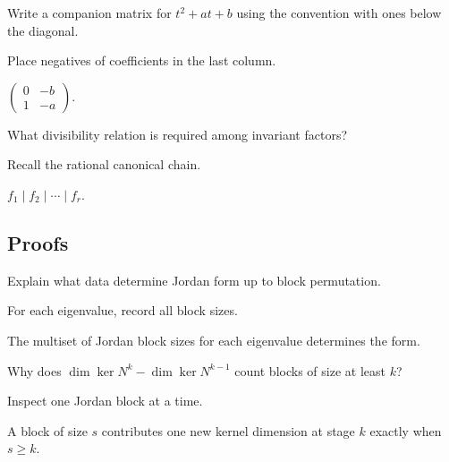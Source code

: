 \begin{exercise}\label{exr:i12-expand-04}
Write a companion matrix for \(t^2+at+b\) using the convention with ones below the diagonal.
\end{exercise}
\begin{hint}
Place negatives of coefficients in the last column.
\end{hint}
\begin{solution}
\(\begin{pmatrix}0&-b\\1&-a\end{pmatrix}\).
\end{solution}

\begin{exercise}\label{exr:i12-expand-05}
What divisibility relation is required among invariant factors?
\end{exercise}
\begin{hint}
Recall the rational canonical chain.
\end{hint}
\begin{solution}
\(f_1\mid f_2\mid\cdots\mid f_r\).
\end{solution}

\subsection*{Proofs}

\begin{exercise}\label{exr:i12-expand-06}
Explain what data determine Jordan form up to block permutation.
\end{exercise}
\begin{hint}
For each eigenvalue, record all block sizes.
\end{hint}
\begin{solution}
The multiset of Jordan block sizes for each eigenvalue determines the form.
\end{solution}

\begin{exercise}\label{exr:i12-expand-07}
Why does \(\dim\ker N^k-\dim\ker N^{k-1}\) count blocks of size at least \(k\)?
\end{exercise}
\begin{hint}
Inspect one Jordan block at a time.
\end{hint}
\begin{solution}
A block of size \(s\) contributes one new kernel dimension at stage \(k\) exactly when \(s\ge k\).
\end{solution}

